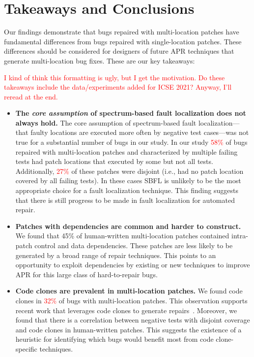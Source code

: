 \documentclass[10pt, conference]{IEEEtran}
\newcommand\todo[1]{\textcolor{red}{#1}}
\begin{document}
\section{Takeaways and Conclusions}
\label{sec:takeaways}

Our findings demonstrate that bugs repaired with multi-location patches have
fundamental differences from bugs repaired with single-location patches. These
differences should be considered for designers of future APR techniques that
generate multi-location bug fixes. These are our key takeaways:

\todo{I kind of think this formatting is ugly, but I get the motivation.  Do
  these takeaways include the data/experiments added for ICSE 2021?  Anyway,
  I'll reread at the end.}
\begin{itemize}[wide, labelindent=0pt]
\item \textbf{The \emph{core assumption} of spectrum-based fault
  localization does not always hold.}
The core assumption of spectrum-based fault localization---that faulty locations
are executed more often by negative test cases---was not true for a substantial
number of bugs in our study. In our study \todo{58\%} of bugs repaired with
multi-location patches and characterized by multiple failing tests had patch
locations that executed by some but not all tests. Additionally, \todo{27\%} of
these patches were disjoint (i.e., had no patch location covered by all failing
tests).  In these cases SBFL is unlikely to be the most appropriate choice for a
fault localization technique. This finding suggests that there is still progress
to be made in fault localization for automated repair.

\item \textbf{Patches with dependencies are common and harder to construct.}
We found that 45\% of human-written multi-location patches contained
intra-patch control and data dependencies. These patches are less likely to be
generated by a broad range of repair techniques. 
This points to an opportunity to exploit dependencies by
existing or new techniques to improve APR for this large class of hard-to-repair
bugs.

\item\textbf{Code clones are prevalent in multi-location patches.}
We found code clones in \todo{32\%} of bugs with multi-location
patches. This observation supports recent work that leverages code clones to
generate repairs~\cite{saha2019harnessing}. Moreover, we found that there is a
correlation between negative tests with disjoint coverage and code clones in
human-written patches. This suggests the existence of a heuristic for
identifying which bugs would benefit most from code clone-specific techniques.


\end{itemize}
\end{document}
